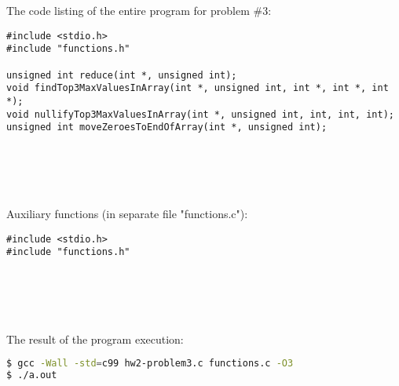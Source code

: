 \documentclass{article}
\begin{document}
	
		\rmfamily
		\noindent The code listing of the entire program for problem \#3:
		\begin{verbatim}
#include <stdio.h>
#include "functions.h"

unsigned int reduce(int *, unsigned int);
void findTop3MaxValuesInArray(int *, unsigned int, int *, int *, int *);
void nullifyTop3MaxValuesInArray(int *, unsigned int, int, int, int);
unsigned int moveZeroesToEndOfArray(int *, unsigned int);
		\end{verbatim}
		
		
\paragraph{}\
\paragraph{}\

	\rmfamily
	\noindent Auxiliary functions (in separate file "functions.c"):	
	\begin{verbatim} 
#include <stdio.h>
#include "functions.h"
	\end{verbatim}
		
\paragraph{}\
\paragraph{}\
		
		\rmfamily
		\noindent The result of the program execution:
		
		\ttfamily
		\begin{lstlisting}[language=bash]
$ gcc -Wall -std=c99 hw2-problem3.c functions.c -O3
$ ./a.out
		\end{lstlisting}
		
\paragraph{}\	
\paragraph{}\
\paragraph{}\
\paragraph{}\
\end{document}
